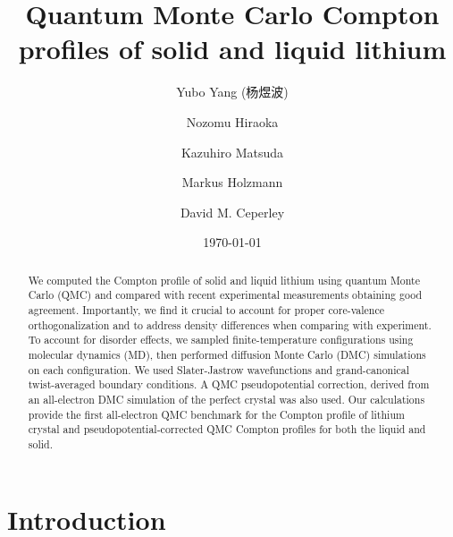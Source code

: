 \documentclass[aps,prb,showpacs,preprintnumbers,amsmath,amssymb,superscriptaddress,twocolumn]{revtex4-1}
\begin{document}
\begin{CJK*}{UTF8}{}
\title{Quantum Monte Carlo Compton profiles of solid and liquid lithium}
\author{Yubo Yang (杨煜波)}
\author{Nozomu Hiraoka}
\author{Kazuhiro Matsuda}
\author{Markus Holzmann}
\author{David M. Ceperley}
\date{\today}
\begin{abstract}
We computed the Compton profile of solid and liquid lithium using quantum Monte Carlo (QMC) and compared with recent experimental measurements obtaining good agreement. Importantly, we find it crucial to account for proper core-valence orthogonalization and to address density differences when comparing with experiment. To account for disorder effects, we sampled finite-temperature configurations using molecular dynamics (MD), then performed diffusion Monte Carlo (DMC) simulations on each configuration. We used Slater-Jastrow wavefunctions and grand-canonical twist-averaged boundary conditions. A QMC pseudopotential correction, derived from an all-electron DMC simulation of the perfect crystal was also used. Our calculations provide the first all-electron QMC benchmark for the Compton profile of lithium crystal and pseudopotential-corrected QMC Compton profiles for both the liquid and solid.
\end{abstract}
\pacs{}
\maketitle
\end{CJK*}

\section{Introduction} \label{sec:intro}
\end{document}
